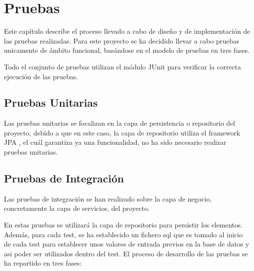 \chapter{Pruebas}
	
	Este capítulo describe el proceso llevado a cabo de diseño y de implementación de las pruebas realizadas. Para este proyecto se ha decidido llevar a cabo pruebas unicamente de ámbito funcional, basándose en el modelo de pruebas en tres fases.
	
	\vspace{5mm}
	
	Todo el conjunto de pruebas utilizan el módulo JUnit \cite{jpaunit} para verificar la correcta ejecución de las pruebas.
	
	\minitoc
	
		\section{Pruebas Unitarias}
		
		Las pruebas unitarias se focalizan en la capa de persistencia o repositorio del proyecto, debido a que en este caso, la capa de repositorio utiliza el framework JPA \cite{jpa}, el cuál garantiza ya una funcionalidad, no ha sido necesario realizar pruebas unitarias.
		
		\section{Pruebas de Integración}
		
		Las pruebas de integración se han realizado sobre la capa de negocio, concretamente la capa de servicios, del proyecto.
		
		\vspace{5mm}
		
		En estas pruebas se utilizará la capa de repositorio para persistir los elementos. Además, para cada test, se ha establecido un fichero sql que es tomado al inicio de cada test para establecer unos valores de entrada previos en la base de datos y asi poder ser utilizados dentro del test. El proceso de desarrollo de las pruebas se ha repartido en tres fases:
		
